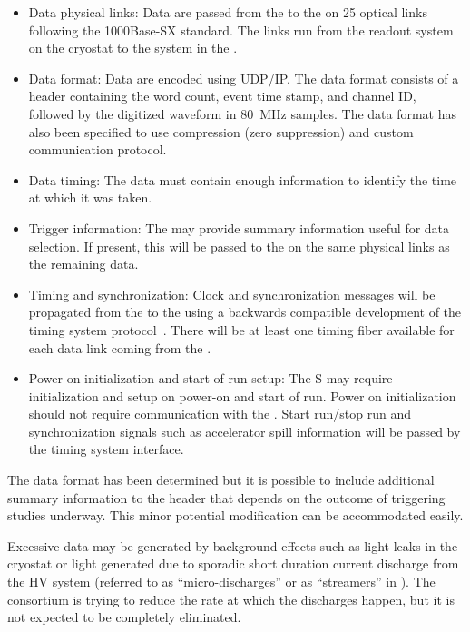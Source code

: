 \begin{itemize}

\item Data physical links: Data are passed from the  to the  on 25 optical links following the 1000Base-SX standard. The links run from the  readout system on the cryostat to the  system in the .

\item Data format: Data are encoded using UDP/IP.  The data format consists of a header containing the word count, event time stamp, and channel ID, followed by the digitized waveform in \SI{80}{MHz} samples.
The data format has also been specified to use compression (zero suppression) and custom communication protocol.

\item Data timing: The data must contain enough information to identify the time at which it was taken.

\item Trigger information: The  may provide summary information useful for data selection. If present, this will be passed to the  on the same physical links as the remaining data.

\item Timing and synchronization: Clock and synchronization messages will be propagated from the  to the  using a backwards compatible development of the  timing system protocol~\cite{bib:docdb1651}. There will be at least one timing fiber available for each data link coming from the . 

\item Power-on initialization and start-of-run setup:  The S may require initialization and setup on power-on and start of run. Power on initialization should not require communication with the . Start run/stop run and synchronization signals such as accelerator spill information will be passed by the timing system interface.

\end{itemize}

The data format has been determined but it is possible to include additional summary information to the header that depends on the outcome of triggering studies underway. This minor potential modification can be accommodated easily.


Excessive  data may be generated by background effects such as light leaks in the cryostat or light generated due to sporadic short duration current discharge from the HV system (referred to as ``micro-discharges'' or as ``streamers'' in ).  The  consortium is trying to reduce the rate at which the discharges happen, but it is not expected to be completely eliminated. 

